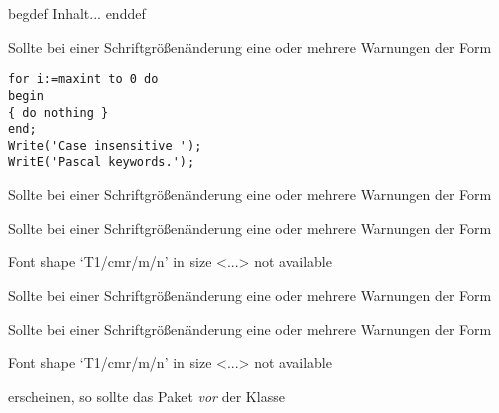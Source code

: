 \documentclass[english,ngerman,ttfont=roboto,ToDo=inline,final]{tudscrmanual}
\newenvironment{Bla}{begdef}{enddef}
\begin{document}
\begin{Bla}
Inhalt...
\end{Bla}

Sollte bei einer Schriftgrößenänderung eine oder mehrere Warnungen der Form
\begin{lstlisting}
for i:=maxint to 0 do
begin
{ do nothing }
end;
Write('Case insensitive ');
WritE('Pascal keywords.');
\end{lstlisting}
Sollte bei einer Schriftgrößenänderung eine oder mehrere Warnungen der Form


Sollte bei einer Schriftgrößenänderung eine oder mehrere Warnungen der Form
  \begin{Code}[gobble=2]
    Font shape `T1/cmr/m/n' in size <...> not available
  \end{Code}
Sollte bei einer Schriftgrößenänderung eine oder mehrere Warnungen der Form



  Sollte bei einer Schriftgrößenänderung eine oder mehrere Warnungen der Form
  \begin{Code}
    Font shape `T1/cmr/m/n' in size <...> not available
  \end{Code}%
  erscheinen, so sollte das Paket  \emph{vor} der Klasse 
\end{document}
